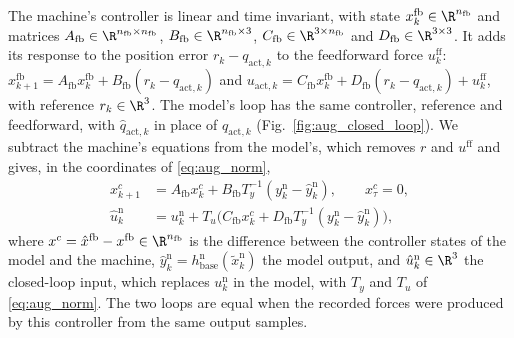 The machine's controller is linear and time invariant, with state
$x^{\mathrm{fb}}_k\in\R^{n_{\mathrm{fb}}}$ and matrices
$A_{\mathrm{fb}}\in\R^{n_{\mathrm{fb}}\times n_{\mathrm{fb}}}$,
$B_{\mathrm{fb}}\in\R^{n_{\mathrm{fb}}\times3}$,
$C_{\mathrm{fb}}\in\R^{3\times n_{\mathrm{fb}}}$ and
$D_{\mathrm{fb}}\in\R^{3\times3}$.
It adds its response to the position error $r_k-q_{\mathrm{act},k}$ to the
feedforward force $u^{\mathrm{ff}}_k$:
$x^{\mathrm{fb}}_{k+1}=A_{\mathrm{fb}}x^{\mathrm{fb}}_k+B_{\mathrm{fb}}(r_k-q_{\mathrm{act},k})$
and
$u_{\mathrm{act},k}=C_{\mathrm{fb}}x^{\mathrm{fb}}_k+D_{\mathrm{fb}}(r_k-q_{\mathrm{act},k})+u^{\mathrm{ff}}_k$,
with reference $r_k\in\R^3$.
The model's loop has the same controller, reference and feedforward, with
$\hat q_{\mathrm{act},k}$ in place of $q_{\mathrm{act},k}$
(Fig.~\ref{fig:aug_closed_loop}).
We subtract the machine's equations from the model's, which removes $r$ and
$u^{\mathrm{ff}}$ and gives, in the coordinates of \eqref{eq:aug_norm},
\begin{equation}
\begin{aligned}
 x^c_{k+1}&=A_{\mathrm{fb}}x^c_k
   +B_{\mathrm{fb}}T_y^{-1}(y^{\mathrm n}_k-\hat y^{\mathrm n}_k),
   \qquad x^c_\tau=0,\\
 \hat u^{\mathrm n}_k&=u^{\mathrm n}_k
   +T_u\bigl(C_{\mathrm{fb}}x^c_k
   +D_{\mathrm{fb}}T_y^{-1}(y^{\mathrm n}_k-\hat y^{\mathrm n}_k)\bigr),
\end{aligned}
\label{eq:aug_residual_loop}
\end{equation}
where $x^c=\hat x^{\mathrm{fb}}-x^{\mathrm{fb}}\in\R^{n_{\mathrm{fb}}}$ is the
difference between the controller states of the model and the machine,
$\hat y^{\mathrm n}_k=h^{\mathrm n}_{\mathrm{base}}(\tilde x^{\mathrm n}_k)$ the
model output, and $\hat u^{\mathrm n}_k\in\R^3$ the closed-loop input, which
replaces $u^{\mathrm n}_k$ in the model, with $T_y$ and $T_u$ of
\eqref{eq:aug_norm}.
The two loops are equal when the recorded forces were produced by this
controller from the same output samples.

